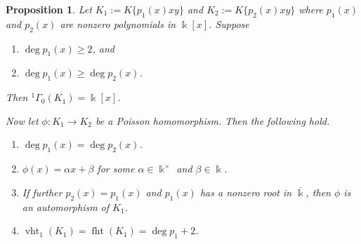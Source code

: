 \documentclass[12pt]{amsart}
\theoremstyle{plain}
\newtheorem{proposition}[theorem]{Proposition}
\numberwithin{theorem}{section}
\numberwithin{equation}{theorem}
\theoremstyle{definition}
\DeclareMathOperator{\fht}{fht}
\DeclareMathOperator{\vht}{vht}
\begin{document}
\begin{proposition} 
\label{zzpro5.2}
Let $K_1 := K\{p_1(x)xy\}$ and $K_2 :=K\{p_2(x)xy\}$ where 
$p_1(x)$ and $p_2(x)$ are nonzero polynomials  in $\Bbbk[x]$. Suppose
\begin{enumerate}
\item[(a)]
$\deg p_1(x)\geq 2$, and 
\item[(b)]
$\deg p_1(x)\geq \deg p_2(x)$. 
\end{enumerate}
Then ${^1\Gamma}_{0}(K_1)=\Bbbk[x]$.
\smallskip

Now let $\phi: K_1\to K_2$ be a Poisson homomorphism. Then the following 
hold.
\begin{enumerate}
\item[(1)]
$\deg p_1(x)=\deg p_2(x)$.
\item[(2)]
$\phi(x)=\alpha x+ \beta$ for some $\alpha\in \Bbbk^{\times}$ and
$\beta\in \Bbbk$. 
\item[(3)]
If further $p_2(x)=p_1(x)$ and
$p_1(x)$ has a nonzero root in $\overline{\Bbbk}$, then 
$\phi$ is an automorphism of $K_1$.
\item[(4)]
$\vht_1(K_1)=\fht(K_1)= \deg p_1 +2$. 
\end{enumerate}
\end{proposition}
\end{document}
